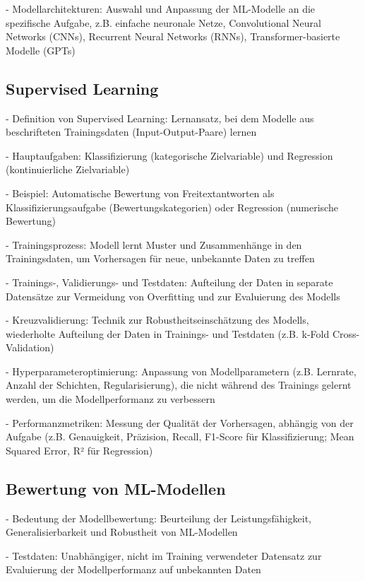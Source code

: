 - Modellarchitekturen: Auswahl und Anpassung der ML-Modelle an die spezifische Aufgabe, z.B. einfache neuronale Netze, Convolutional Neural Networks (CNNs), Recurrent Neural Networks (RNNs), Transformer-basierte Modelle (GPTs)

\subsection{Supervised Learning}

- Definition von Supervised Learning: Lernansatz, bei dem Modelle aus beschrifteten Trainingsdaten (Input-Output-Paare) lernen

- Hauptaufgaben: Klassifizierung (kategorische Zielvariable) und Regression (kontinuierliche Zielvariable)

- Beispiel: Automatische Bewertung von Freitextantworten als Klassifizierungsaufgabe (Bewertungskategorien) oder Regression (numerische Bewertung)

- Trainingsprozess: Modell lernt Muster und Zusammenhänge in den Trainingsdaten, um Vorhersagen für neue, unbekannte Daten zu treffen

- Trainings-, Validierungs- und Testdaten: Aufteilung der Daten in separate Datensätze zur Vermeidung von Overfitting und zur Evaluierung des Modells

- Kreuzvalidierung: Technik zur Robustheitseinschätzung des Modells, wiederholte Aufteilung der Daten in Trainings- und Testdaten (z.B. k-Fold Cross-Validation)

- Hyperparameteroptimierung: Anpassung von Modellparametern (z.B. Lernrate, Anzahl der Schichten, Regularisierung), die nicht während des Trainings gelernt werden, um die Modellperformanz zu verbessern

- Performanzmetriken: Messung der Qualität der Vorhersagen, abhängig von der Aufgabe (z.B. Genauigkeit, Präzision, Recall, F1-Score für Klassifizierung; Mean Squared Error, R² für Regression)

\subsection{Bewertung von ML-Modellen}

- Bedeutung der Modellbewertung: Beurteilung der Leistungsfähigkeit, Generalisierbarkeit und Robustheit von ML-Modellen

- Testdaten: Unabhängiger, nicht im Training verwendeter Datensatz zur Evaluierung der Modellperformanz auf unbekannten Daten

